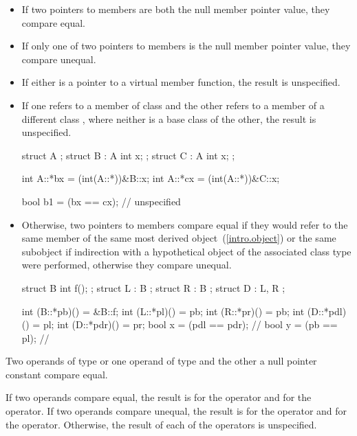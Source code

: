 \begin{itemize}
\item
If two pointers to members are both the null member pointer value, they compare
equal.

\item
If only one of two pointers to members is the null member pointer value, they
compare unequal.

\item
If either is a pointer to a virtual member function, the result is unspecified.

\item
If one refers to a member of class  and the other refers to a member
of a different class , where neither is a base class of the other,
the result is unspecified.
\enterexample
\begin{codeblock}
struct A {};
struct B : A { int x; };
struct C : A { int x; };

int A::*bx = (int(A::*))&B::x;
int A::*cx = (int(A::*))&C::x;

bool b1 = (bx == cx);   // unspecified
\end{codeblock}
\exitexample

\item
Otherwise, two pointers to members compare equal if they would refer to the same member of
the same most derived object~(\ref{intro.object}) or the same subobject if
indirection with a hypothetical object of the associated
class type were performed, otherwise they compare unequal.
\enterexample 

\begin{codeblock}
struct B {
  int f();
};
struct L : B { };
struct R : B { };
struct D : L, R { };

int (B::*pb)() = &B::f;
int (L::*pl)() = pb;
int (R::*pr)() = pb;
int (D::*pdl)() = pl;
int (D::*pdr)() = pr;
bool x = (pdl == pdr);          // 
bool y = (pb == pl);            // 
\end{codeblock}
\exitexample
\end{itemize}

\pnum
Two operands of type  or one operand of type
 and the other a null pointer constant compare equal.

\pnum
If two operands compare equal, the result is  for
the \tcode{==} operator and  for the \tcode{!=} operator. If two operands
compare unequal, the result is  for the \tcode{==} operator and
 for the \tcode{!=} operator. Otherwise, the result of each of the
operators is unspecified.

